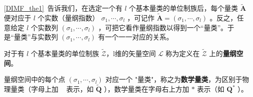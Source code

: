 
\begin{issues}
\issueTODO
\end{issues}

\autoref{DIMF_the1}~告诉我们，在选定一个有 $l$ 个基本量类的单位制族后，每个量类 $\tilde{\boldsymbol{A}}$ 便对应于 $l$ 个实数（量纲指数） $\sigma_1,\cdots,\sigma_l$ ，可记作 $\tilde{\boldsymbol{A}}=(\sigma_1,\cdots,\sigma_l)$ 。反之，任意给定 $l$ 个实数列 $(\sigma_1,\cdots,\sigma_l)$ ，可把它看作量纲指数以得到一个“量类”。于是“量类”与实数列 $(\sigma_1,\cdots,\sigma_l)$ 有一个一一对应的关系。
\begin{definition}{}
对于有 $l$ 个基本量类的单位制族 $\tilde{\mathscr{Z}}$，l维的矢量空间 $\mathscr{L}$ 称为定义在 $\tilde{\mathscr{Z}}$ 上的\textbf{量纲空间}。
\end{definition}
量纲空间中的每个点 $(\sigma_1,\cdots,\sigma_l)$ 对应一个 "量类"，称之为\textbf{数学量类}，为区别于物理量类（字母上加 ~ 表示，如 $\tilde{\boldsymbol{Q}}$ ），数学量类在字母右上方加 $*$ 表示（如 $\boldsymbol{Q}^*$ ）。